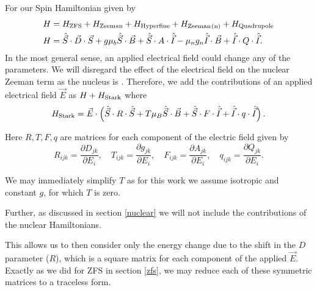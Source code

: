 \section{}\label{stark}
For our Spin Hamiltonian given by 
\begin{equation}
    \begin{align}
        H &= H_{\ce{ZFS}} + H_{\ce{Zeeman}} + H_{\ce{Hyperfine}} + H_{\ce{Zeeman(n)}}+ H_{\ce{Quadrupole}}\\ 
        H &= \hat{\vec{S}}\cdot{\vec{D}}\cdot{\vec{S}} + g\mu_b \hat{\vec{S}}\cdot \vec{B}  + \hat{\vec{S}}\cdot A \cdot \hat{\vec{I}}  -  \mu_n g_n \hat{\vec{I}}\cdot\vec{B} + \hat{\vec{I}} \cdot Q \cdot \hat{\vec{I}}.
    \end{align}
\end{equation}
In the most general sense, an applied electrical field could change any of the parameters. 
We will disregard the effect of the electrical field on the nuclear Zeeman term as the nucleus is  \cite{mims}. 
Therefore, we add the contributions of an applied electrical field $\vec{E}$ as $H + H_{\ce{Stark}}$ where 
\begin{equation}
    H_{\ce{Stark}} = \vec{E}\cdot\left(\hat{\vec{S}}\cdot R \cdot \hat{\vec{S}} + T \mu_B \hat{\vec{S}}\cdot \vec{B} + \hat{\vec{S}}\cdot F \cdot \hat{\vec{I}} + \hat{\vec{I}} \cdot q \cdot \hat{\vec{I}} \right). 
    \label{eq:}
\end{equation}%

Here $R, T, F, q$ are matrices for each component of the electric field given by 
\begin{equation}
    R_{ijk} = \frac{\partial D_{jk}}{\partial E_i}, \quad 
    T_{ijk} = \frac{\partial g_{jk}}{\partial E_i}, \quad 
    F_{ijk} = \frac{\partial A_{jk}}{\partial E_i}, \quad 
    q_{ijk} = \frac{\partial Q_{jk}}{\partial E_i}.
    \label{eq:}
\end{equation}

We may immediately simplify $T$ as for this work we assume isotropic and constant $g$, for which $T$ is zero.  

Further, as discussed in section \ref{nuclear} we will not include the contributions of the nuclear Hamiltonians. 

This allows us to then consider only the energy change due to the shift in the $D$ parameter ($R$), which is a square matrix for each component of the applied $\vec{E}$. 
Exactly as we did for ZFS in section \ref{zfs}, we may reduce each of these symmetric matrices to a traceless form. 

